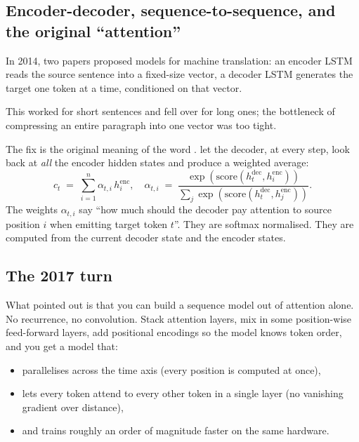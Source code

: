 \subsection{Encoder-decoder, sequence-to-sequence, and the original ``attention''}

In 2014, two papers \citep{sutskever2014seq2seq, cho2014gru} proposed
 models for machine translation: an encoder LSTM
reads the source sentence into a fixed-size vector, a decoder LSTM generates
the target one token at a time, conditioned on that vector.

This worked for short sentences and fell over for long ones; the bottleneck
of compressing an entire paragraph into one vector was too tight.

The fix is the original meaning of the word .
\citet{bahdanau2014attention} let the decoder, at every step, look back at
\emph{all} the encoder hidden states and produce a weighted average:
\begin{equation}
  c_t \;=\; \sum_{i=1}^{n} \alpha_{t,i}\, h_i^{\text{enc}},
  \quad
  \alpha_{t,i} \;=\; \frac{\exp(\text{score}(h_t^{\text{dec}}, h_i^{\text{enc}}))}
                          {\sum_{j} \exp(\text{score}(h_t^{\text{dec}}, h_j^{\text{enc}}))}.
\end{equation}
The weights \(\alpha_{t,i}\) say ``how much should the decoder pay attention
to source position \(i\) when emitting target token \(t\)''. They are softmax
normalised. They are computed from the current decoder state and the encoder
states.


\subsection{The 2017 turn}

What \citet{vaswani2017attention} pointed out is that you can build a
sequence model out of attention alone. No recurrence, no convolution.
Stack attention layers, mix in some position-wise feed-forward layers, add
positional encodings so the model knows token order, and you get a model
that:

\begin{itemize}
\item parallelises across the time axis (every position is computed at
once),
\item lets every token attend to every other token in a single layer (no
vanishing gradient over distance),
\item and trains roughly an order of magnitude faster on the same hardware.
\end{itemize}

